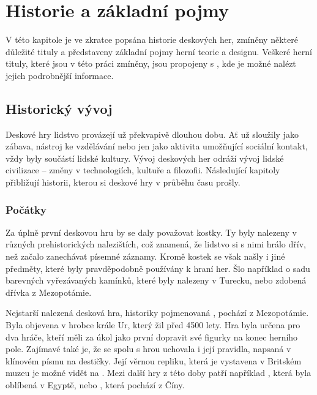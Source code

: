 \chapter{Historie a základní pojmy}
\label{chap:theory}

V této kapitole je ve zkratce popsána historie deskových her, zmíněny některé důležité tituly a představeny základní pojmy herní teorie a designu. Veškeré herní tituly, které jsou v této práci zmíněny, jsou propojeny s , kde je možné nalézt jejich podrobnější informace.


\section{Historický vývoj}
\label{sec:history}

Deskové hry lidstvo provázejí už překvapivě dlouhou dobu. Ať už sloužily jako zábava, nástroj ke vzdělávání nebo jen jako aktivita umožňující sociální kontakt, vždy byly součástí lidské kultury. Vývoj deskových her odráží vývoj lidské civilizace -- změny v technologiích, kultuře a filozofii. Následující kapitoly přibližují historii, kterou si deskové hry v průběhu času prošly.

\subsection{Počátky}
\label{subsec:beginnings}

Za úplně první deskovou hru by se daly považovat kostky. Ty byly nalezeny v různých prehistorických nalezištích, což znamená, že lidstvo si s nimi hrálo dřív, než začalo zanechávat písemné záznamy. Kromě kostek se však našly i jiné předměty, které byly pravděpodobně používány k hraní her. Šlo například o sadu barevných vyřezávaných kamínků, které byly nalezeny v Turecku, nebo zdobená dřívka z Mezopotámie. \cite{attia_2018}

Nejstarší nalezená desková hra, historiky pojmenovaná , pochází z Mezopotámie. Byla objevena v hrobce krále Ur, který žil před 4500 lety. Hra byla určena pro dva hráče, kteří měli za úkol jako první dopravit své figurky na konec herního pole. Zajímavé také je, že se spolu s hrou uchovala i její pravidla, napsaná v klínovém písmu na destičky. Její věrnou repliku, která je vystavena v Britském muzeu je možné vidět na . Mezi další hry z této doby patří například , která byla oblíbená v Egyptě, nebo , která pochází z Číny. \cite{british_museum_2021}

